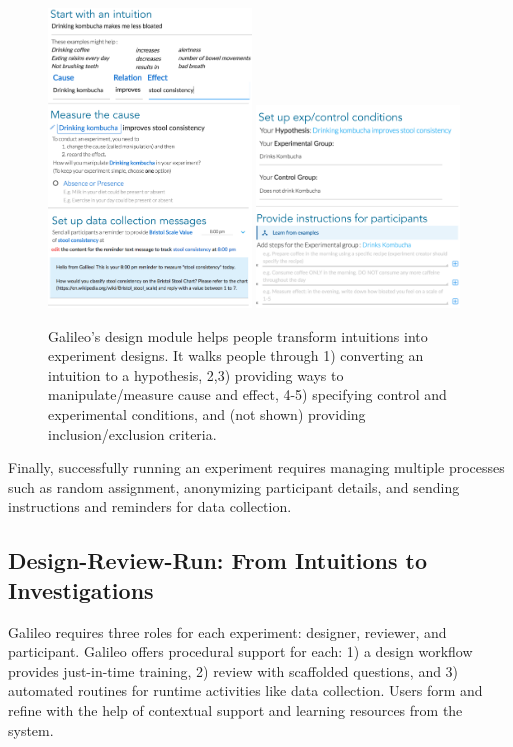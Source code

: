 \begin{figure}[h]
  \centering
  \includegraphics[width=0.48\textwidth]{figures/galileo/galileo-2-design}
  \includegraphics[width=0.48\textwidth]{figures/galileo/galileo-2-design-2}
  \caption[Galileo's design module helps people transform intuitions into experiment designs]
{Galileo's  design module helps people transform intuitions into experiment designs. It walks people through 1) converting an intuition to a hypothesis, 2,3) providing ways to manipulate/measure cause and effect, 4-5) specifying control and experimental conditions, and (not shown) providing inclusion/exclusion criteria.}
  \label{fig:galileo-2}
\end{figure}

Finally, successfully running an experiment requires managing multiple processes such as random assignment, anonymizing participant details, and sending instructions and reminders for data collection.

\subsection{Design-Review-Run: From Intuitions to Investigations}
Galileo requires three roles for each experiment: designer, reviewer, and participant. Galileo offers procedural support for each: 1) a design workflow provides just-in-time training, 2) review with scaffolded questions, and 3) automated routines for runtime activities like data collection. Users form and refine with the help of contextual support and learning resources from the system. 

